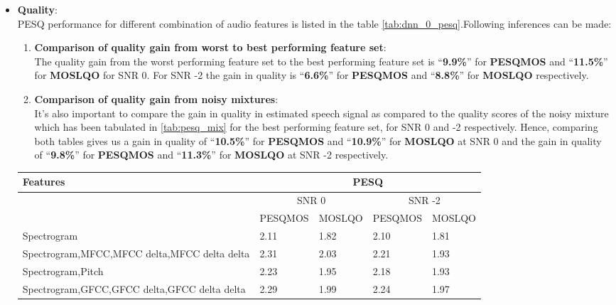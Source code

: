 \begin{enumerate}
\begin{itemize}
\item \textbf{Quality}:\\
PESQ performance for different combination of audio features is listed in the table \ref{tab:dnn_0_pesq}.Following inferences can be made:\\
\begin{enumerate}
\item \textbf{Comparison of quality gain from worst to best performing feature set}:\\
The quality gain from the worst performing feature set to the best performing feature set is \enquote{\textbf{9.9\%}} for \textbf{PESQMOS} and \enquote{\textbf{11.5\%}} for \textbf{MOSLQO}  for SNR 0. For SNR -2 the gain in quality is \enquote{\textbf{6.6\%}} for \textbf{PESQMOS} and \enquote{\textbf{8.8\%}} for \textbf{MOSLQO} respectively.
\item \textbf{Comparison of quality gain from noisy mixtures}:\\
It's also important to compare the gain in quality in estimated speech signal as compared to the quality scores of the noisy mixture which  has been tabulated in \ref{tab:pesq_mix} for  the best performing feature set, for SNR 0 and -2 respectively. Hence, comparing both tables gives us a gain in quality of \enquote{\textbf{10.5\%}} for \textbf{PESQMOS} and \enquote{\textbf{10.9\%}} for \textbf{MOSLQO} at SNR 0 and the gain in quality of \enquote{\textbf{9.8\%}} for \textbf{PESQMOS} and \enquote{\textbf{11.3\%}} for \textbf{MOSLQO} at SNR -2 respectively.
\end{enumerate} 
\begin{table}[!htbp]
\centering
\begin{tabular}{ |p{8cm}|p{1.7cm}|p{1.7cm}|p{1.7cm}|p{1.7cm}|  }
\hline
\textbf{Features} & \multicolumn{4}{|c|}{\textbf{PESQ}}\\
\hline
\cellcolor{black} & \multicolumn{2}{|c|}{SNR 0} & \multicolumn{2}{|c|}{SNR -2}\\
\hline
\cellcolor{black} & PESQMOS & MOSLQO & PESQMOS & MOSLQO\\
\hline
Spectrogram	& 2.11	& 1.82	& 2.10	& 1.81\\
\hline
Spectrogram,MFCC,MFCC delta,MFCC delta delta	& 2.31	& 2.03	& 2.21	& 1.93\\
\hline
Spectrogram,Pitch	& 2.23	& 1.95	& 2.18	& 1.93\\
\hline
\cellcolor{yellow}Spectrogram,GFCC,GFCC delta,GFCC delta delta	& 2.29	& 1.99	& \cellcolor{yellow}2.24	& \cellcolor{yellow}1.97\\

\end{tabular}
\end{table}
\end{itemize}
\end{enumerate}
